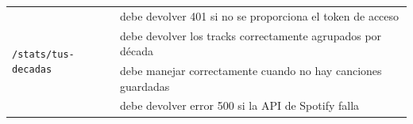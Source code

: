 \begin{longtable}{|p{5cm}|p{9cm}|}
  \multirow{4}{*}{\texttt{/stats/tus-decadas}}          & debe devolver 401 si no se proporciona el token de acceso                                \\ \cline{2-2}
                                                        & debe devolver los tracks correctamente agrupados por década                              \\ \cline{2-2}
                                                        & debe manejar correctamente cuando no hay canciones guardadas                             \\ \cline{2-2}
                                                        & debe devolver error 500 si la API de Spotify falla                                       \\ \hline
\end{longtable}


